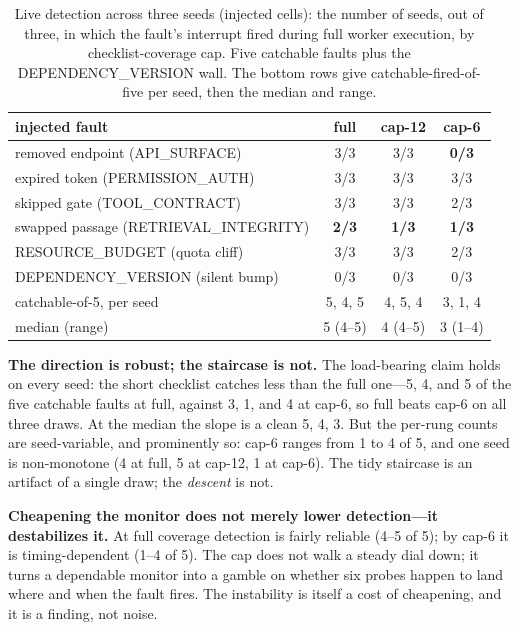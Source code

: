 \documentclass[acmsmall,screen]{acmart}
\begin{document}
\begin{table}[t]
\caption{Live detection across three seeds (injected cells): the number of seeds,
out of three, in which the fault's interrupt fired during full worker execution,
by checklist-coverage cap. Five catchable faults plus the DEPENDENCY\_VERSION
wall. The bottom rows give catchable-fired-of-five per seed, then the median and
range.}
\label{tab:v3-detection}
\begin{tabular}{lccc}
\toprule
injected fault & full & cap-12 & cap-6 \\
\midrule
removed endpoint (API\_SURFACE)        & 3/3 & 3/3 & \textbf{0/3} \\
expired token (PERMISSION\_AUTH)       & 3/3 & 3/3 & 3/3 \\
skipped gate (TOOL\_CONTRACT)          & 3/3 & 3/3 & 2/3 \\
swapped passage (RETRIEVAL\_INTEGRITY) & \textbf{2/3} & \textbf{1/3} & \textbf{1/3} \\
RESOURCE\_BUDGET (quota cliff)         & 3/3 & 3/3 & 2/3 \\
DEPENDENCY\_VERSION (silent bump)      & 0/3 & 0/3 & 0/3 \\
\midrule
catchable-of-5, per seed & 5, 4, 5 & 4, 5, 4 & 3, 1, 4 \\
\quad median (range)     & 5 (4--5) & 4 (4--5) & 3 (1--4) \\
\bottomrule
\end{tabular}
\end{table}

\textbf{The direction is robust; the staircase is not.} The load-bearing claim
holds on every seed: the short checklist catches less than the full one---5, 4,
and 5 of the five catchable faults at full, against 3, 1, and 4 at cap-6, so full
beats cap-6 on all three draws. At the median the slope is a clean 5, 4, 3. But
the per-rung counts are seed-variable, and prominently so: cap-6 ranges from 1 to
4 of 5, and one seed is non-monotone (4 at full, 5 at cap-12, 1 at cap-6). The
tidy staircase is an artifact of a single draw; the \emph{descent} is not.

\textbf{Cheapening the monitor does not merely lower detection---it destabilizes
it.} At full coverage detection is fairly reliable (4--5 of 5); by cap-6 it is
timing-dependent (1--4 of 5). The cap does not walk a steady dial down; it turns a
dependable monitor into a gamble on whether six probes happen to land where and
when the fault fires. The instability is itself a cost of cheapening, and it is a
finding, not noise.
\end{document}
